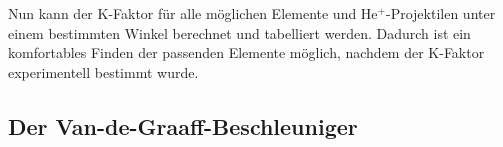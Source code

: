 Nun kann der K-Faktor für alle möglichen Elemente und He$^+$-Projektilen unter einem bestimmten Winkel berechnet und tabelliert werden. Dadurch ist ein komfortables Finden der passenden Elemente möglich, nachdem der K-Faktor experimentell bestimmt wurde.

\subsection{Der Van-de-Graaff-Beschleuniger}
